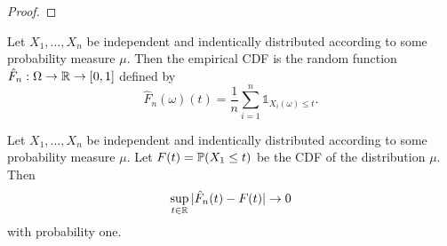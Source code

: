 \begin{proof}
  \uses{}
  \notready
\end{proof}

\begin{definition}
  \label{def:empiricalCDF}
  \notready
  Let $X_1, \dots, X_n$ be independent and indentically distributed according to some probability measure $\mu$. Then the empirical CDF is the random function $\hat F_n : \Omega \to \mathbb{R} \to [0,1]$ defined by
  \[
  \hat F_n(\omega)(t) = \frac{1}{n}\sum_{i=1}^n \mathbb{1}_{X_i(\omega) \leq t}.
  \]
\end{definition}

\begin{theorem}
  \label{thm:empiricalCDF_independent_variables_converges_CDF}
  \notready
Let $X_1, \dots, X_n$ be independent and indentically distributed according to some probability measure $\mu$. Let $F(t) = \mathbb{P} (X_1 \leq t)$ be the CDF of the distribution $\mu$. Then
\[
\sup_{t \in \mathbb{R}} |\hat F_n(t) - F(t)| \to 0
\]
with probability one.
\end{theorem}
